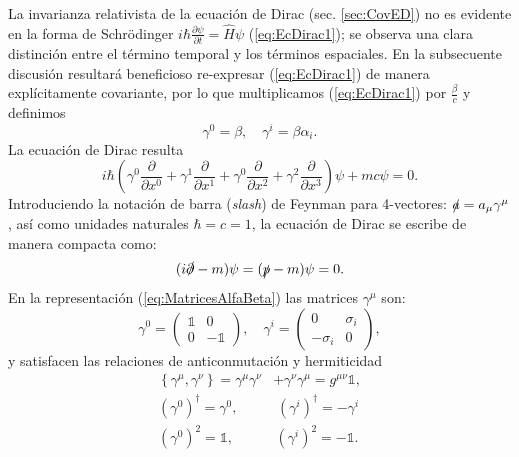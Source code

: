La invarianza relativista de la ecuación de Dirac (sec. \ref{sec:CovED}) no es evidente en la forma de Schrödinger $i\hbar \frac{\partial \psi}{\partial t}= \hat{H}\psi$ (\ref{eq:EcDirac1}); se observa una clara distinción entre el término temporal y los términos espaciales. En la subsecuente discusión resultará beneficioso re-expresar (\ref{eq:EcDirac1}) de manera explícitamente covariante, por lo que multiplicamos (\ref{eq:EcDirac1}) por $\frac{\beta}{c}$ y definimos 
\begin{equation}\label{eq:MatGammaDef}
	\gamma^0=\beta,\quad \gamma^i=\beta\alpha_i.
\end{equation}
La ecuación de Dirac resulta
\begin{equation}\label{eq:EDbis}
	i\hbar\left(\gamma^0 \frac{\partial}{\partial x^0}+\gamma^1 \frac{\partial}			{\partial x^1}+\gamma^0 \frac{\partial}{\partial x^2}+\gamma^2 						\frac{\partial}{\partial x^3} \right)\psi + mc\psi=0.
\end{equation}
Introduciendo la notación de barra (\textit{slash}) de Feynman para 4-vectores: $\slashed{a}=a_{\mu}\gamma^{\mu}$, así como unidades naturales $\hbar=c=1$, la ecuación de Dirac se escribe de manera compacta como:
\begin{equation}\label{eq:ED}
	(i\slashed{\partial}-m)\psi=(\slashed{p}-m)\psi=0.
\end{equation}
En la representación (\ref{eq:MatricesAlfaBeta}) las matrices $\gamma^{\mu}$ son:
\begin{equation}\label{eq:MatGammaRep}
     \gamma^0=\begin{pmatrix}
                \mathbb{1} & 0 \\
                0 & -\mathbb{1}
           \end{pmatrix},\quad
     \gamma^i=\begin{pmatrix}
		0 & \sigma_i \\
		  -\sigma_i & 0
	      \end{pmatrix},
\end{equation}
y satisfacen las relaciones de anticonmutación y hermiticidad\footnotemark
\begin{subequations}\label{eq:AlgClifford}
\begin{align}
 \left\{ \gamma^{\mu},\gamma^{\nu}\right\}=\gamma^{\mu}\gamma^{\nu} &+\gamma^{\nu}\gamma^{\mu} =g^{\mu \nu}\mathbb{1},\label{eq:AnticonmutacionClifford}\\[8pt] 
 (\gamma^{0})^{\dagger}=\gamma^{0},\; & \; (\gamma^{i})^{\dagger}=-\gamma^{i} \label{HermClifford}\\[8pt]
 (\gamma^{0})^2 = \mathbb{1},\,&\,(\gamma^{i})^2 = -\mathbb{1}.\label{eq:UnitClifford}
\end{align}
\end{subequations}

